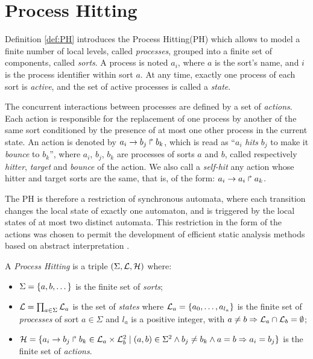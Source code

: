 
\section{Process Hitting }

Definition \ref{def:PH} introduces the Process Hitting(PH) \cite{PMR10-TCSB}
which allows to model a finite number of local levels,
called \emph{processes},
grouped into a finite set of components, called \emph{sorts}.
A process is noted $a_i$, where $a$ is the sort's name,
and $i$ is the process identifier within sort $a$.
At any time, exactly one process of each sort is \emph{active},
and the set of active processes is called a \emph{state}.

The concurrent interactions between processes are defined by a set of \emph{actions}.
Each action is responsible for the replacement of one process by another of the same sort
conditioned by the presence of at most one other process in the current state.
An action is denoted by $a_i\rightarrow b_j\Rsh b_k$, which is read as
“$a_i$ \emph{hits} $b_j$ to make it \emph{bounce} to $b_k$”,
where $a_i$, $b_j$, $b_k$ are processes of sorts $a$ and $b$,
called respectively \emph{hitter}, \emph{target} and
\emph{bounce} of the action.
We also call a \emph{self-hit} any action whose hitter and target sorts are the same,
that is, of the form: $a_i\rightarrow a_i\Rsh a_k$.

The PH is therefore a restriction of synchronous automata, where each transition
changes the local state of exactly one automaton,
and is triggered by the local states of at most two distinct automata.
This restriction in the form of the actions was chosen to permit
the development of efficient static analysis methods
based on abstract interpretation \cite{PMR12-MSCS}.

\begin{definition}\label{def:PH}
  A \emph{Process Hitting} is a triple $(\Sigma,\mathcal{L},\mathcal{H})$ where:
  \begin{itemize}
    \item  $\Sigma = \{a,b,\dots\}$ is the finite set of \emph{sorts};
    \item  $\mathcal{L} = \prod_{a\in\Sigma} \mathcal{L}_a$ is the set of \emph{states} where
      $\mathcal{L}_a = \{a_0,\dots,a_{l_a}\}$
      is the finite set of \emph{processes} of sort $a\in\Sigma$
      and $l_a$ is a positive integer, with $a\neq b\Rightarrow \mathcal{L}_a \cap \mathcal{L}_b = \emptyset$;
    \item  $\mathcal{H} = \{ a_i\rightarrow b_j\Rsh b_k \in \mathcal{L}_a \times \mathcal{L}_b^2 \mid
      (a,b) \in \Sigma^2 \wedge b_j\neq b_k \wedge a=b\Rightarrow a_i=b_j\}$
      is the finite set of \emph{actions}.
  \end{itemize}
\end{definition}

